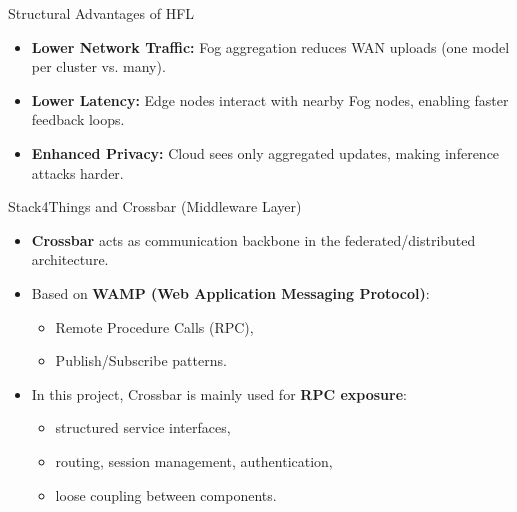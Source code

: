 \documentclass[aspectratio=169]{beamer}
\begin{document}
\begin{frame}{Structural Advantages of HFL}
\begin{itemize}
  \item \textbf{Lower Network Traffic:} Fog aggregation reduces WAN uploads (one model per cluster vs. many).
  \item \textbf{Lower Latency:} Edge nodes interact with nearby Fog nodes, enabling faster feedback loops.
  \item \textbf{Enhanced Privacy:} Cloud sees only aggregated updates, making inference attacks harder.
\end{itemize}
\end{frame}

\begin{frame}{Stack4Things and Crossbar (Middleware Layer)}
\begin{itemize}
  \item \textbf{Crossbar} acts as communication backbone in the federated/distributed architecture.
  \item Based on \textbf{WAMP (Web Application Messaging Protocol)}:
  \begin{itemize}
    \item Remote Procedure Calls (RPC),
    \item Publish/Subscribe patterns.
  \end{itemize}
  \item In this project, Crossbar is mainly used for \textbf{RPC exposure}:
  \begin{itemize}
    \item structured service interfaces,
    \item routing, session management, authentication,
    \item loose coupling between components.
  \end{itemize}
\end{itemize}
\end{frame}
\end{document}
